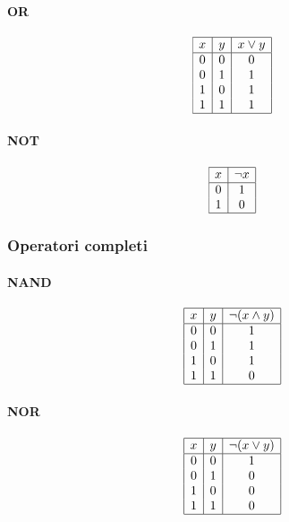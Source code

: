 \documentclass[a4paper,12pt]{article}
\theoremstyle{mystyle}
\begin{document}
\paragraph{OR}
\[
\begin{array}{|c|c|c|}
\hline
x & y & x \lor y \\
\hline
0 & 0 & 0 \\
0 & 1 & 1 \\
1 & 0 & 1 \\
1 & 1 & 1 \\
\hline
\end{array}
\]

\paragraph{NOT}
\[
\begin{array}{|c|c|}
\hline
x & \lnot x \\
\hline
0 & 1 \\
1 & 0 \\
\hline
\end{array}
\]

\subsubsection{Operatori completi}
\paragraph{NAND}
\[
\begin{array}{|c|c|c|}
\hline
x & y & \lnot(x \land y) \\
\hline
0 & 0 & 1 \\
0 & 1 & 1 \\
1 & 0 & 1 \\
1 & 1 & 0 \\
\hline
\end{array}
\]

\paragraph{NOR}
\[
\begin{array}{|c|c|c|}
\hline
x & y & \lnot(x \lor y) \\
\hline
0 & 0 & 1 \\
0 & 1 & 0 \\
1 & 0 & 0 \\
1 & 1 & 0 \\
\hline
\end{array}
\]
\end{document}
